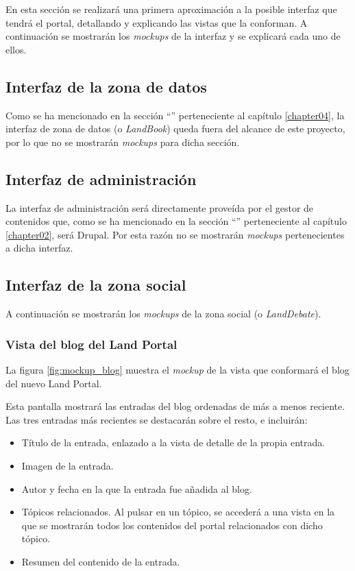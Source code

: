 En esta sección se realizará una primera aproximación a la posible interfaz que tendrá el portal, detallando y explicando las vistas que la conforman.  A continuación se mostrarán los \textit{mockups} de la interfaz y se explicará cada uno de ellos.



\subsection{Interfaz de la zona de datos}
Como se ha mencionado en la sección ``'' perteneciente al capítulo \ref{chapter04}, la interfaz de zona de datos (o \textit{LandBook}) queda fuera del alcance de este proyecto, por lo que no se mostrarán \textit{mockups} para dicha sección.



\subsection{Interfaz de administración}
La interfaz de administración será directamente proveída por el gestor de contenidos que, como se ha mencionado en la sección ``'' perteneciente al capítulo \ref{chapter02}, será Drupal.  Por esta razón no se mostrarán \textit{mockups} pertenecientes a dicha interfaz.



\subsection{Interfaz de la zona social}
A continuación se mostrarán los \textit{mockups} de la zona social (o \textit{LandDebate}).


\subsubsection{Vista del blog del Land Portal}
\label{chapter04:mockup_blog}
La figura \ref{fig:mockup_blog} muestra el \textit{mockup} de la vista que conformará el blog del nuevo Land Portal.

Esta pantalla mostrará las entradas del blog ordenadas de más a menos reciente.  Las tres entradas más recientes se destacarán sobre el resto, e incluirán:
\begin{itemize}
	\item Título de la entrada, enlazado a la vista de detalle de la propia entrada.
	\item Imagen de la entrada.
	\item Autor y fecha en la que la entrada fue añadida al blog.
	\item Tópicos relacionados.  Al pulsar en un tópico, se accederá a una vista en la que se mostrarán todos los contenidos del portal relacionados con dicho tópico.
	\item Resumen del contenido de la entrada.
\end{itemize}

